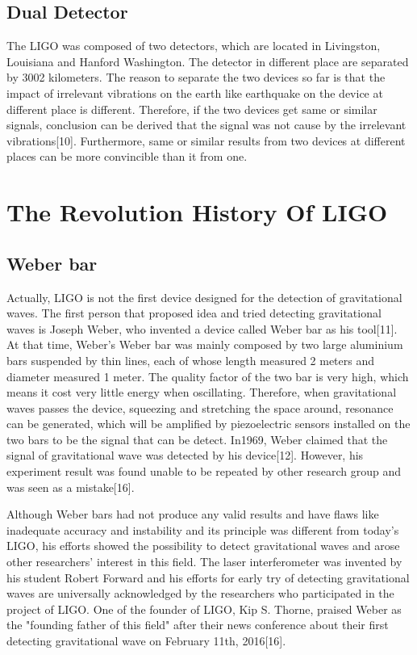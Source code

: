 \documentclass[journal,comsoc,twoside]{IEEEtran}
\begin{document}
\subsection{Dual Detector}
The LIGO was composed of two detectors, which are located in Livingston, Louisiana and Hanford Washington. The detector in different place are separated by 3002 kilometers. The reason to separate the two devices so far is that the impact of irrelevant vibrations on the earth like earthquake on the device at different place is different. Therefore, if the two devices get same or similar signals, conclusion can be derived that the signal was not cause by the irrelevant vibrations[10]. Furthermore, same or similar results from two devices at different places can be more convincible than it from one.
\section{The Revolution History Of LIGO}
\subsection{Weber bar}
Actually, LIGO is not the first device designed for the detection of gravitational waves. The first person that proposed idea and tried detecting gravitational waves is Joseph Weber, who invented a device called Weber bar as his tool[11]. At that time, Weber's Weber bar was mainly composed by two large aluminium bars suspended by thin lines, each of whose length measured 2 meters and diameter measured 1 meter. The quality factor of the two bar is very high, which means it cost very little energy when oscillating. Therefore, when gravitational waves passes the device, squeezing and stretching the space around, resonance can be generated, which will be amplified by piezoelectric sensors installed on the two bars to be the signal that can be detect. In1969, Weber claimed that the signal of gravitational wave was detected by his device[12]. However, his experiment result was found unable to be repeated by other research group and was seen as a mistake[16].

Although Weber bars had not produce any valid results and have flaws like inadequate accuracy and instability and its principle was different from today's LIGO, his efforts showed the possibility to detect gravitational waves and arose other researchers' interest in this field. The laser interferometer was invented by his student Robert Forward and his efforts for early try of detecting gravitational waves are universally acknowledged by the researchers who participated in the project of LIGO. One of the founder of LIGO, Kip S. Thorne, praised Weber as the "founding father of this field" after their news conference about their first detecting gravitational wave on February 11th, 2016[16].
\end{document}
